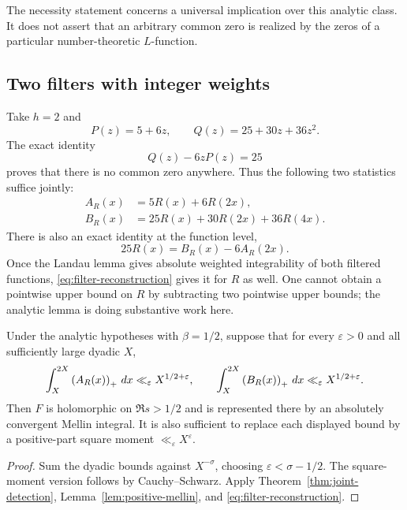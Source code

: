 The necessity statement concerns a universal implication over this analytic class. It does not assert that an arbitrary common zero is realized by the zeros of a particular number-theoretic $L$-function.

\subsection{Two filters with integer weights}

Take $h=2$ and
\[
 P(z)=5+6z,\qquad Q(z)=25+30z+36z^2.
\]
The exact identity
\begin{equation}\label{eq:filter-bezout}
 Q(z)-6zP(z)=25
\end{equation}
proves that there is no common zero anywhere. Thus the following two statistics suffice jointly:
\begin{align*}
 A_R(x)&=5R(x)+6R(2x),\\
 B_R(x)&=25R(x)+30R(2x)+36R(4x).
\end{align*}
There is also an exact identity at the function level,
\begin{equation}\label{eq:filter-reconstruction}
 25R(x)=B_R(x)-6A_R(2x).
\end{equation}
Once the Landau lemma gives absolute weighted integrability of both filtered functions, \eqref{eq:filter-reconstruction} gives it for $R$ as well. One cannot obtain a pointwise upper bound on $R$ by subtracting two pointwise upper bounds; the analytic lemma is doing substantive work here.

\begin{corollary}\label{cor:joint-half}
Under the analytic hypotheses with $\beta=1/2$, suppose that for every $\varepsilon>0$ and all sufficiently large dyadic $X$,
\[
 \int_X^{2X}\left(A_R(x)\right)_{+}\,dx\ll_\varepsilon X^{1/2+\varepsilon},
 \qquad
 \int_X^{2X}\left(B_R(x)\right)_{+}\,dx\ll_\varepsilon X^{1/2+\varepsilon}.
\]
Then $F$ is holomorphic on $\Re s>1/2$ and is represented there by an absolutely convergent Mellin integral. It is also sufficient to replace each displayed bound by a positive-part square moment $\ll_\varepsilon X^\varepsilon$.
\end{corollary}

\begin{proof}
Sum the dyadic bounds against $X^{-\sigma}$, choosing $\varepsilon<\sigma-1/2$. The square-moment version follows by Cauchy--Schwarz. Apply Theorem~\ref{thm:joint-detection}, Lemma~\ref{lem:positive-mellin}, and \eqref{eq:filter-reconstruction}.
\end{proof}

